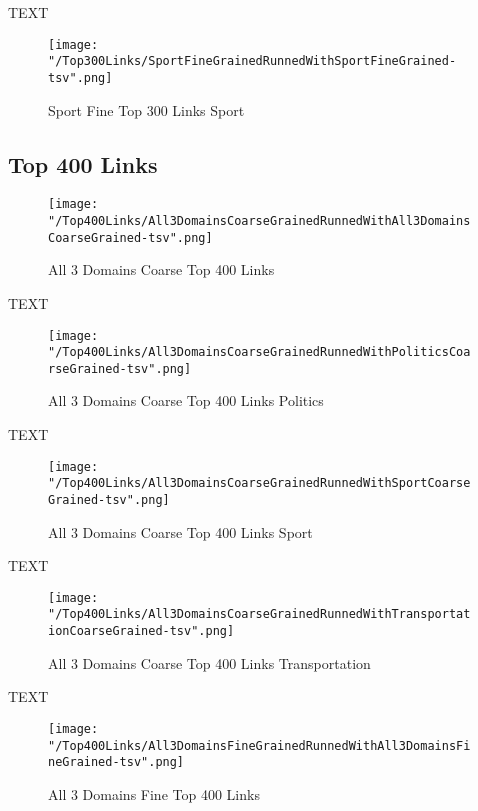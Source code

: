 \documentclass[thesis=M,english]{FITthesis}[2018/05/30]
\begin{document}
		TEXT	

	\begin{figure}[H]\centering
		\texttt{[image: "/Top300Links/SportFineGrainedRunnedWithSportFineGrained-tsv".png]}
		\caption{Sport Fine Top 300 Links Sport}\label{}	
	\end{figure}

\subsection{Top 400 Links}

	\begin{figure}[H]\centering
		\texttt{[image: "/Top400Links/All3DomainsCoarseGrainedRunnedWithAll3DomainsCoarseGrained-tsv".png]}
		\caption{All 3 Domains Coarse Top 400 Links}\label{}
	\end{figure}

	TEXT

	\begin{figure}[H]\centering
		\texttt{[image: "/Top400Links/All3DomainsCoarseGrainedRunnedWithPoliticsCoarseGrained-tsv".png]}
		\caption{All 3 Domains Coarse Top 400 Links Politics}\label{}
	\end{figure}	

	TEXT	

	\begin{figure}[H]\centering
		\texttt{[image: "/Top400Links/All3DomainsCoarseGrainedRunnedWithSportCoarseGrained-tsv".png]}
		\caption{All 3 Domains Coarse Top 400 Links Sport}\label{}
	\end{figure}
	
		TEXT	

	\begin{figure}[H]\centering
		\texttt{[image: "/Top400Links/All3DomainsCoarseGrainedRunnedWithTransportationCoarseGrained-tsv".png]}
		\caption{All 3 Domains Coarse Top 400 Links Transportation}\label{}	
	\end{figure}
		
		TEXT	

	\begin{figure}[H]\centering
		\texttt{[image: "/Top400Links/All3DomainsFineGrainedRunnedWithAll3DomainsFineGrained-tsv".png]}
		\caption{All 3 Domains Fine Top 400 Links }\label{}	
	\end{figure}
	
\end{document}
